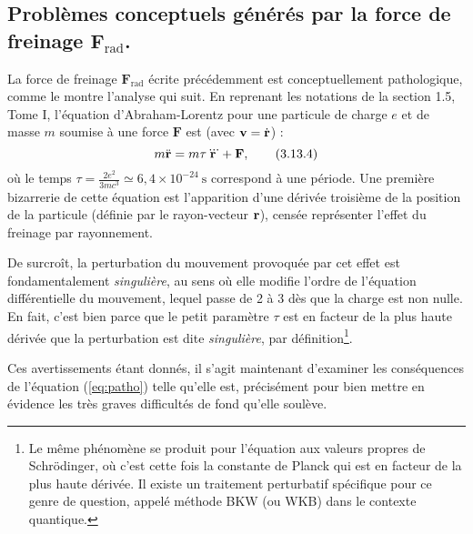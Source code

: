 \documentclass[a4paper,10pt]{report}
\begin{document}
\subsection{Problèmes conceptuels générés par la force de freinage $\textbf{F}_\text{rad}$.}
La force de freinage $\textbf{F}_\text{rad}$ écrite précédemment est conceptuellement pathologique, comme le montre l'analyse qui suit. En reprenant les notations de la section 1.5, Tome I, l'équation d'Abraham-Lorentz pour une particule de charge $e$ et de masse $m$ soumise à une force $\textbf{F}$ est (avec $\vb{v} = \dot{\vb{r}}$) :
\begin{equation}
	m \ddot{\vb{r}} = m \tau \dddot{\vb{r}} + \vb{F}, \tag{3.13.4} \label{eq:patho}
\end{equation}
où le temps $\tau = \frac{2 e^2}{3 m c^3} \simeq 6{,}4 \times 10^{-24}~\text{s}$ correspond à une période. 
Une première bizarrerie de cette équation est l’apparition d’une dérivée troisième de la position de la particule (définie par le rayon-vecteur $\vb{r}$), censée représenter l’effet du freinage par rayonnement.

De surcroît, la perturbation du mouvement provoquée par cet effet est fondamentalement \textit{singulière}, au sens où elle modifie l’ordre de l’équation différentielle du mouvement, lequel passe de 2 à 3 dès que la charge est non nulle. En fait, c’est bien parce que le petit paramètre $\tau$ est en facteur de la plus haute dérivée que la perturbation est dite \textit{singulière}, par définition\footnote{Le même phénomène se produit pour l’équation aux valeurs propres de Schrödinger, où c’est cette fois la constante de Planck qui est en facteur de la plus haute dérivée. Il existe un traitement perturbatif spécifique pour ce genre de question, appelé méthode BKW (ou WKB) dans le contexte quantique.}.

Ces avertissements étant donnés, il s’agit maintenant d’examiner les conséquences de l’équation (\ref{eq:patho}) telle qu’elle est, précisément pour bien mettre en évidence les très graves difficultés de fond qu’elle soulève.
\end{document}
